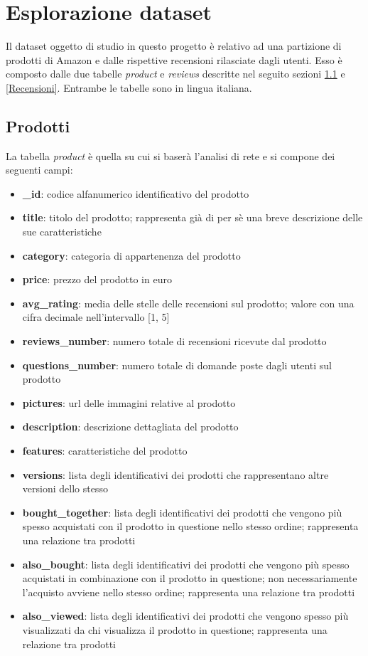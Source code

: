 \section{Esplorazione dataset}\label{EsplorazioneDataset}
Il dataset oggetto di studio in questo progetto è relativo ad una partizione di prodotti di Amazon e dalle rispettive recensioni rilasciate dagli utenti. Esso è composto dalle due tabelle \textit{product} e \textit{reviews} descritte nel seguito sezioni \ref{Prodotti} e \ref{Recensioni}. Entrambe le tabelle sono in lingua italiana.

\subsection{Prodotti}\label{Prodotti}
La tabella \textit{product} è quella su cui si baserà l'analisi di rete e si compone dei seguenti campi:
\begin{itemize}
    \item \textbf{\_id}: codice alfanumerico identificativo del prodotto
    \item \textbf{title}: titolo del prodotto; rappresenta già di per sè una breve descrizione delle sue caratteristiche
    \item \textbf{category}: categoria di appartenenza del prodotto
    \item \textbf{price}: prezzo del prodotto in euro
    \item \textbf{avg\_rating}: media delle stelle delle recensioni sul prodotto; valore con una cifra decimale nell'intervallo [1, 5] 
    \item \textbf{reviews\_number}: numero totale di recensioni ricevute dal prodotto
    \item \textbf{questions\_number}: numero totale di domande poste dagli utenti sul prodotto
    \item \textbf{pictures}: url delle immagini relative al prodotto
    \item \textbf{description}: descrizione dettagliata del prodotto
    \item \textbf{features}: caratteristiche del prodotto
    \item \textbf{versions}: lista degli identificativi dei prodotti che rappresentano altre versioni dello stesso
    \item \textbf{bought\_together}: lista degli identificativi dei prodotti che vengono più spesso acquistati con il prodotto in questione nello stesso ordine; rappresenta una relazione tra prodotti
    \item \textbf{also\_bought}: lista degli identificativi dei prodotti che vengono più spesso acquistati in combinazione con il prodotto in questione; non necessariamente l'acquisto avviene nello stesso ordine; rappresenta una relazione tra prodotti
    \item \textbf{also\_viewed}: lista degli identificativi dei prodotti che vengono spesso più visualizzati da chi visualizza il prodotto in questione; rappresenta una relazione tra prodotti
\end{itemize}
